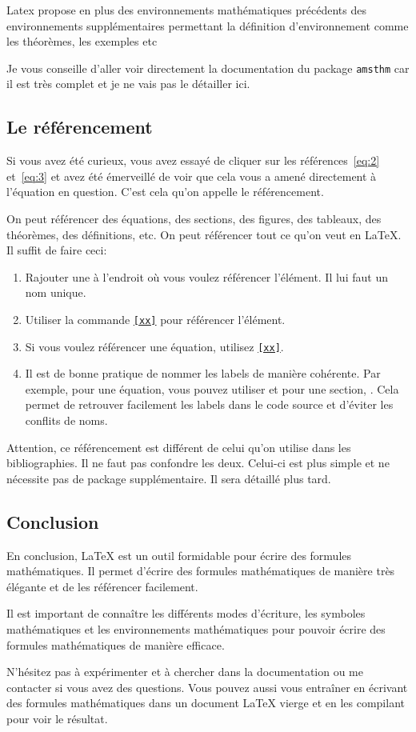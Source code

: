 Latex propose en plus des environnements mathématiques précédents des environnements 
supplémentaires permettant la définition d'environnement comme les théorèmes, les exemples etc

Je vous conseille d'aller voir directement la documentation du package \texttt{amsthm}
car il est très complet et je ne vais pas le détailler ici.

\subsection{Le référencement}\label{subsec:latex_math_ref}

Si vous avez été curieux, vous avez essayé de cliquer sur les 
références~\eqref{eq:2} et~\eqref{eq:3} et avez été émerveillé de voir que
cela vous a amené directement à l'équation en question.
C'est cela qu'on appelle le référencement.

On peut référencer des équations, des sections, des figures, des tableaux,
des théorèmes, des définitions, etc. On peut référencer tout ce qu'on veut
en LaTeX. Il suffit de faire ceci:
\begin{enumerate}
    \item Rajouter une \texttt{\label{xx}} à l'endroit
    où vous voulez référencer l'élément. Il lui faut un nom unique.
    \item Utiliser la commande \texttt{\ref{xx}} pour
    référencer l'élément.
    \item Si vous voulez référencer une équation, utilisez \texttt{\eqref{xx}}.
    \item Il est de bonne pratique de nommer les labels de manière
    cohérente. Par exemple, pour une équation, vous pouvez utiliser
    \texttt{\label{eq:nom_de_l_equation}} et pour une section,
    \texttt{\label{sec:nom_de_la_section}}. Cela permet de
    retrouver facilement les labels dans le code source et
    d'éviter les conflits de noms.
\end{enumerate}

Attention, ce référencement est différent de celui qu'on utilise
dans les bibliographies. Il ne faut pas confondre les deux. Celui-ci
est plus simple et ne nécessite pas de package supplémentaire.
Il sera détaillé plus tard.

\subsection{Conclusion}\label{subsec:latex_math_conclusion}
En conclusion, LaTeX est un outil formidable pour écrire des formules mathématiques.
Il permet d'écrire des formules mathématiques de manière très élégante et
de les référencer facilement. 

Il est important de connaître les différents modes d'écriture,
les symboles mathématiques et les environnements mathématiques pour
pouvoir écrire des formules mathématiques de manière efficace.

N'hésitez pas à expérimenter et à chercher dans la documentation 
ou me contacter si vous avez des questions.
Vous pouvez aussi vous entraîner en écrivant des formules mathématiques
dans un document LaTeX vierge et en les compilant pour voir le résultat.
